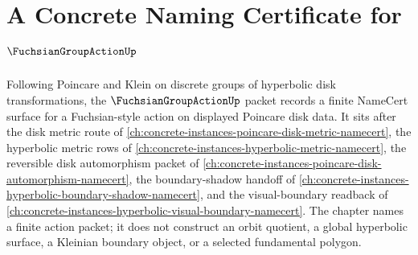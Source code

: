 \chapter{A Concrete Naming Certificate for $\FuchsianGroupActionUp$}
\label{ch:concrete-instances-fuchsian-group-action-namecert}

Following Poincare and Klein on discrete groups of hyperbolic disk transformations, the $\FuchsianGroupActionUp$ packet records a finite NameCert surface for a Fuchsian-style action on displayed Poincare disk data. It sits after the disk metric route of \autoref{ch:concrete-instances-poincare-disk-metric-namecert}, the hyperbolic metric rows of \autoref{ch:concrete-instances-hyperbolic-metric-namecert}, the reversible disk automorphism packet of \autoref{ch:concrete-instances-poincare-disk-automorphism-namecert}, the boundary-shadow handoff of \autoref{ch:concrete-instances-hyperbolic-boundary-shadow-namecert}, and the visual-boundary readback of \autoref{ch:concrete-instances-hyperbolic-visual-boundary-namecert}. The chapter names a finite action packet; it does not construct an orbit quotient, a global hyperbolic surface, a Kleinian boundary object, or a selected fundamental polygon.

